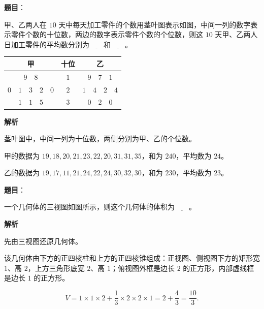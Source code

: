 \begin{answer}

\textbf{题目}：

甲、乙两人在 $10$ 天中每天加工零件的个数用茎叶图表示如图，中间一列的数字表示零件个数的十位数，两边的数字表示零件个数的个位数，则这 $10$ 天甲、乙两人日加工零件的平均数分别为$\underline{\qquad}$和$\underline{\qquad}$。

\begin{center}
\begin{tabular}{ccc}
\toprule
甲 & 十位 & 乙 \\
\midrule
$9\quad8$ & $1$ & $9\quad7\quad1$ \\
$0\quad1\quad3\quad2\quad0$ & $2$ & $1\quad4\quad2\quad4$ \\
$1\quad1\quad5$ & $3$ & $0\quad2\quad0$ \\
\bottomrule
\end{tabular}
\end{center}

\textbf{解析}

茎叶图中，中间一列为十位数，两侧分别为甲、乙的个位数。

甲的数据为 $19,18,20,21,23,22,20,31,31,35$，和为 $240$，平均数为 $24$。

乙的数据为 $19,17,11,21,24,22,24,30,32,30$，和为 $230$，平均数为 $23$。


\end{answer}
\begin{answer}

\textbf{题目}：

一个几何体的三视图如图所示，则这个几何体的体积为$\underline{\qquad}$。
\nopagebreak[4]
\begin{center}\end{center}
\nopagebreak[4]
\textbf{解析}

先由三视图还原几何体。

该几何体由下方的正四棱柱和上方的正四棱锥组成：正视图、侧视图下方的矩形宽 $1$、高 $2$，上方三角形底宽 $2$、高 $1$；俯视图外框是边长 $2$ 的正方形，内部虚线框是边长 $1$ 的正方形。

\nopagebreak[4]
\[V=1\times1\times2+\frac13\times2\times2\times1=2+\frac43=\frac{10}3.\]


\end{answer}
